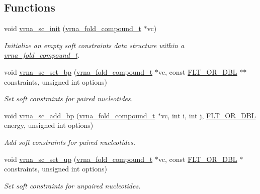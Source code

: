 \subsection*{Functions}
\begin{DoxyCompactItemize}
\item 
void \hyperlink{group__soft__constraints_ga9d977a1681356778cc66dceafbe5b032}{vrna\+\_\+sc\+\_\+init} (\hyperlink{group__fold__compound_ga1b0cef17fd40466cef5968eaeeff6166}{vrna\+\_\+fold\+\_\+compound\+\_\+t} $\ast$vc)
\begin{DoxyCompactList}\small\item\em Initialize an empty soft constraints data structure within a \hyperlink{group__fold__compound_ga1b0cef17fd40466cef5968eaeeff6166}{vrna\+\_\+fold\+\_\+compound\+\_\+t}. \end{DoxyCompactList}\item 
void \hyperlink{group__soft__constraints_ga8e4334b24bc91453fbcda490a4e331af}{vrna\+\_\+sc\+\_\+set\+\_\+bp} (\hyperlink{group__fold__compound_ga1b0cef17fd40466cef5968eaeeff6166}{vrna\+\_\+fold\+\_\+compound\+\_\+t} $\ast$vc, const \hyperlink{group__data__structures_ga31125aeace516926bf7f251f759b6126}{F\+L\+T\+\_\+\+O\+R\+\_\+\+D\+BL} $\ast$$\ast$constraints, unsigned int options)
\begin{DoxyCompactList}\small\item\em Set soft constraints for paired nucleotides. \end{DoxyCompactList}\item 
void \hyperlink{group__soft__constraints_gaf162aedac7422f2eb16ea030f47d2f4b}{vrna\+\_\+sc\+\_\+add\+\_\+bp} (\hyperlink{group__fold__compound_ga1b0cef17fd40466cef5968eaeeff6166}{vrna\+\_\+fold\+\_\+compound\+\_\+t} $\ast$vc, int i, int j, \hyperlink{group__data__structures_ga31125aeace516926bf7f251f759b6126}{F\+L\+T\+\_\+\+O\+R\+\_\+\+D\+BL} energy, unsigned int options)
\begin{DoxyCompactList}\small\item\em Add soft constraints for paired nucleotides. \end{DoxyCompactList}\item 
void \hyperlink{group__soft__constraints_ga99ed63f3ef9e7fe3997932030487a344}{vrna\+\_\+sc\+\_\+set\+\_\+up} (\hyperlink{group__fold__compound_ga1b0cef17fd40466cef5968eaeeff6166}{vrna\+\_\+fold\+\_\+compound\+\_\+t} $\ast$vc, const \hyperlink{group__data__structures_ga31125aeace516926bf7f251f759b6126}{F\+L\+T\+\_\+\+O\+R\+\_\+\+D\+BL} $\ast$constraints, unsigned int options)
\begin{DoxyCompactList}\small\item\em Set soft constraints for unpaired nucleotides. \end{DoxyCompactList}\item 
$$
\end{DoxyCompactItemize}
